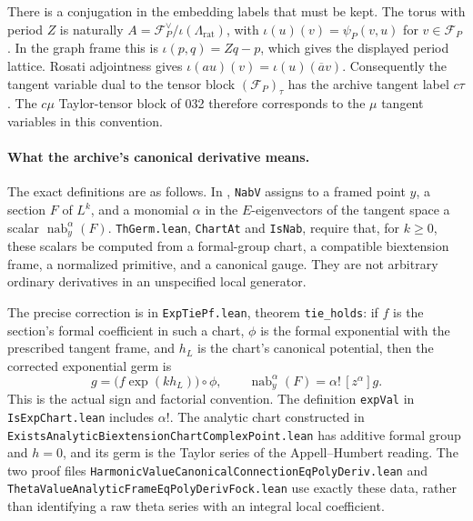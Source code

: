 \documentclass[11pt]{article}
\theoremstyle{definition}\newtheorem{definition}[theorem]{Definition}\newtheorem{remark}[theorem]{Remark}
\begin{document}
There is a conjugation in the embedding labels that must be kept.
The torus with period $Z$ is naturally
$A=\mathcal F_P^\vee/\iota(\Lambda_{\mathrm{rat}})$, with
$\iota(u)(v)=\psi_P(v,u)$ for $v\in\mathcal F_P$.
In the graph frame this is $\iota(p,q)=Zq-p$, which gives the
displayed period lattice.  Rosati adjointness gives
$\iota(au)(v)=\iota(u)(\overline a v)$.
Consequently the tangent variable dual to the tensor block
$(\mathcal F_P)_\tau$ has the archive tangent label $c\tau$.
The $c\mu$ Taylor-tensor block of 032 therefore corresponds to
the $\mu$ tangent variables in this convention.

\paragraph{What the archive's canonical derivative means.}
The exact definitions are as follows.  In
,
\texttt{NabV} assigns to a framed point $y$, a section $F$ of
$L^k$, and a monomial $\alpha$ in the $E$-eigenvectors of the
tangent space a scalar $\operatorname{nab}_y^\alpha(F)$.
\texttt{ThGerm.lean}, \texttt{ChartAt} and \texttt{IsNab}, require
that, for $k\geq0$, these scalars be computed from a formal-group
chart, a compatible biextension frame, a normalized primitive,
and a canonical gauge.  They are not arbitrary ordinary
derivatives in an unspecified local generator.

The precise correction is in
\texttt{ExpTiePf.lean}, theorem \texttt{tie\_holds}: if $f$ is the
section's formal coefficient in such a chart, $\phi$ is the formal
exponential with the prescribed tangent frame, and $h_L$ is the
chart's canonical potential, then the corrected exponential germ
is
\[
       g=\bigl(f\exp(kh_L)\bigr)\circ\phi,
 \qquad
       \operatorname{nab}_y^\alpha(F)=\alpha!\,[z^\alpha]g.
 \tag{A8c}
\]
This is the actual sign and factorial convention.  The definition
\texttt{expVal} in \texttt{IsExpChart.lean} includes $\alpha!$.
The analytic chart constructed in
\nolinkurl{ExistsAnalyticBiextensionChartComplexPoint.lean} has
additive formal group and $h=0$, and its germ is the Taylor series
of the Appell--Humbert reading.  The two proof files
\nolinkurl{HarmonicValueCanonicalConnectionEqPolyDeriv.lean} and
\nolinkurl{ThetaValueAnalyticFrameEqPolyDerivFock.lean} use exactly
these data, rather than identifying a raw theta series with an
integral local coefficient.
\end{document}
